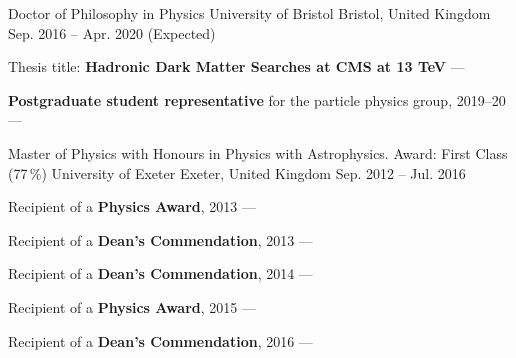 
\begin{cventries}
    \cventry
        {Doctor of Philosophy in Physics} %
        {University of Bristol} %
        {Bristol, United Kingdom} %
        {Sep. 2016 -- Apr. 2020 (Expected)} %
        {
        \begin{cvitems} %
            \item {Thesis title: \textbf{Hadronic Dark Matter Searches at CMS at 13 TeV} --- }
            \vspace{0.5mm}
            \item {\textbf{Postgraduate student representative} for the particle physics group, 2019--20 --- } %
        \end{cvitems}
        }

    \cventry
        {Master of Physics with Honours in Physics with Astrophysics. Award: First Class (77\,\%)} %
        {University of Exeter} %
        {Exeter, United Kingdom} %
        {Sep. 2012 -- Jul. 2016} %
        {
        \begin{cvitems} %
            \item {Recipient of a \textbf{Physics Award}, 2013 --- }
            \vspace{0.5mm}
            \item {Recipient of a \textbf{Dean's Commendation}, 2013 --- }
            \vspace{0.5mm}
            \item {Recipient of a \textbf{Dean's Commendation}, 2014 --- }
            \vspace{0.5mm}
            \item {Recipient of a \textbf{Physics Award}, 2015 --- }
            \vspace{0.5mm}
            \item {Recipient of a \textbf{Dean's Commendation}, 2016 --- }
        \end{cvitems}
        }


\end{cventries}
